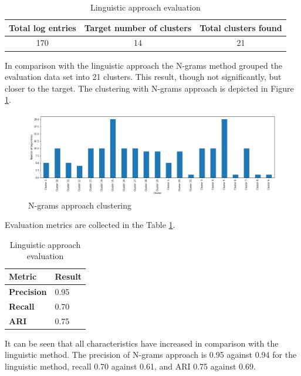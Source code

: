 \documentclass[thesis=M,english]{FITthesis}[2019/12/23]
\begin{document}
\begin{table}[h!]\centering
	\caption{Linguistic approach evaluation}\label{tab:evaluation-conditions-ngrams}
	\begin{tabular}{ |c|c|c| }
		\hline
		\textbf{Total log entries} & \textbf{Target number of clusters} & \textbf{Total clusters found}\\
		\hline
		170 & 14 & 21 \\
		\hline
	\end{tabular}
\end{table}

In comparison with the linguistic approach the N-grams method grouped the evaluation data set into 21 clusters. This result, though not significantly, but closer to the target. The clustering with N-grams approach is depicted in Figure \ref{fig:eval-clustering-ngrams}.

\begin{figure}[h!]\centering
	\includegraphics[scale=0.34]{ngrams_eval}
	\caption{N-grams approach clustering}\label{fig:eval-clustering-ngrams}
\end{figure}

Evaluation metrics are collected in the Table \ref{tab:evaluation-conditions-ngrams}.

\begin{table}[h!]\centering
	\caption{Linguistic approach evaluation}\label{tab:ngrams-evaluation}
	\begin{tabular}{ |m{9em}|m{4em}| }
		\hline
		\textbf{Metric} & \textbf{Result}\\
		\hline
		\textbf{Precision} & 0.95 \\
		\hline
		\textbf{Recall} & 0.70 \\
		\hline
		\textbf{ARI} & 0.75 \\
		\hline
	\end{tabular}
\end{table}

It can be seen that all characteristics have increased in comparison with the linguistic method. The precision of N-grams approach is 0.95 against 0.94 for the linguistic method, recall 0.70 against 0.61, and ARI 0.75 against 0.69. 
\end{document}
